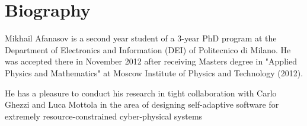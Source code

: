 \section{Biography}

Mikhail Afanasov is a second year student of a 3-year PhD program at the
Department of Electronics and Information (DEI) of Politecnico di Milano. He was
accepted there in November 2012 after receiving Masters degree in "Applied
Physics and Mathematics" at Moscow Institute of Physics and Technology (2012).

He has a pleasure to conduct his research in tight collaboration with Carlo
Ghezzi and Luca Mottola in the area of designing self-adaptive software for
extremely resource-constrained cyber-physical systems
